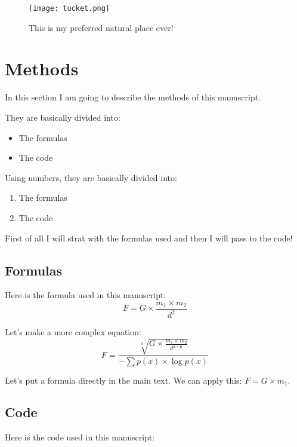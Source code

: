 \documentclass[a4paper, 12pt]{article}
\begin{document}

\begin{figure}
\centering
 \texttt{[image: tucket.png]}
 \caption{This is my preferred natural place ever!}
 \label{fig:brenta}
\end{figure}


\section{Methods}
In this section I am going to describe the methods of this manuscript. 

They are basically divided into:
\begin{itemize}
 \item The formulas
 \item The code
\end{itemize}

Using numbers, they are basically divided into:
\begin{enumerate}
 \item The formulas
 \item The code
\end{enumerate}

First of all I will strat with the formulas used and then I will pass to the code!

\subsection{Formulas}
Here is the formula used in this manuscript:
\begin{equation}
 F = G \times \frac{m_{1} \times m_{2}}{d^{2}}
 \label{eq:newton}
\end{equation}

Let's make a more complex equation:
\begin{equation}
 F = \frac{\sqrt[3]{G \times \frac{m_{1} \times m_{2}}{d^{2 \times \mu}}}}{-\sum{p(x) \times \log{p(x)}}}
\end{equation}

Let's put a formula directly in the main text. We can apply this: $F=G \times m_{1}$.


\subsection{Code}
Here is the code used in this manuscript:

\end{document}
